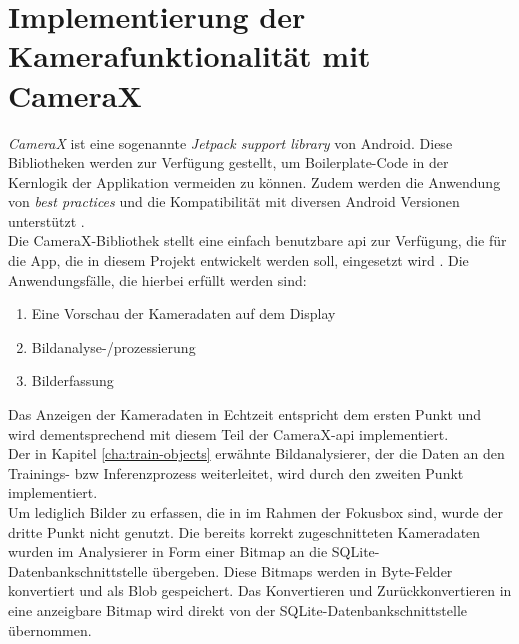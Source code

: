 \documentclass[oneside]{ausarbeitung}
\begin{document}
\section{Implementierung der Kamerafunktionalität mit CameraX}
\textit{CameraX} ist eine sogenannte \textit{Jetpack support library} von Android. Diese Bibliotheken werden zur Verfügung gestellt, um Boilerplate-Code in der Kernlogik der Applikation vermeiden zu können. Zudem werden die Anwendung von \textit{best practices} und die Kompatibilität mit diversen Android Versionen unterstützt \cite{android:jetpack}.\\
Die CameraX-Bibliothek stellt eine einfach benutzbare \ac{api} zur Verfügung, die für die App, die in diesem Projekt entwickelt werden soll, eingesetzt wird \cite{android:camerax}. Die Anwendungsfälle, die hierbei erfüllt werden sind:
\begin{enumerate}
	\item Eine Vorschau der Kameradaten auf dem Display
	\item Bildanalyse-/prozessierung
	\item Bilderfassung
\end{enumerate}
Das Anzeigen der Kameradaten in Echtzeit entspricht dem ersten Punkt und wird dementsprechend mit diesem Teil der CameraX-\ac{api} implementiert.\\
Der in Kapitel \ref{cha:train-objects} erwähnte Bildanalysierer, der die Daten an den Trainings- bzw Inferenzprozess weiterleitet, wird durch den zweiten Punkt implementiert.\\
Um lediglich Bilder zu erfassen, die in im Rahmen der Fokusbox sind, wurde der dritte Punkt nicht genutzt. Die bereits korrekt zugeschnitteten Kameradaten wurden im Analysierer in Form einer Bitmap an die SQLite-Datenbankschnittstelle übergeben. Diese Bitmaps werden in Byte-Felder konvertiert und als Blob gespeichert. Das Konvertieren und Zurückkonvertieren in eine anzeigbare Bitmap wird direkt von der SQLite-Datenbankschnittstelle übernommen.
\end{document}
